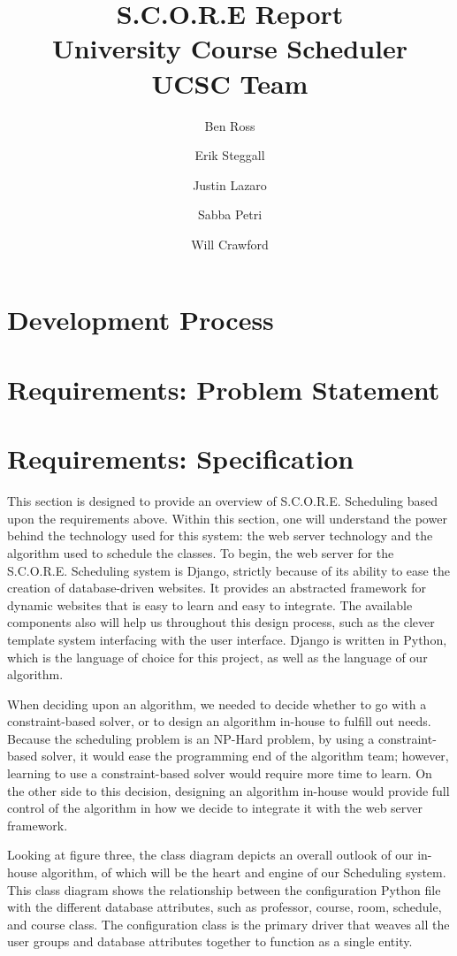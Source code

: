 \documentclass[12pt,article]{memoir}
\title{S.C.O.R.E Report \\ University Course Scheduler \\ UCSC Team}
\author{Ben Ross \\
	\and Erik Steggall \\
	\and Justin Lazaro \\
	\and Sabba Petri \\
	\and Will Crawford}
\date{}
\begin{document}
\maketitle

\chapter{Development Process} %
\chapter{Requirements: Problem Statement} %
\chapter{Requirements: Specification} %
This section is designed to provide an overview of S.C.O.R.E. Scheduling based upon the requirements above. Within this section, one will understand the power behind the technology used for this system: the web server technology and the algorithm used to schedule the classes. To begin, the web server for the S.C.O.R.E. Scheduling system is Django, strictly because of its ability to ease the creation of database-driven websites. It provides an abstracted framework for dynamic websites that is easy to learn and easy to integrate. The available components also will help us throughout this design process, such as the clever template system interfacing with the user interface. Django is written in Python, which is the language of choice for this project, as well as the language of our algorithm.

When deciding upon an algorithm, we needed to decide whether to go with a constraint-based solver, or to design an algorithm in-house to fulfill out needs. Because the scheduling problem is an NP-Hard problem, by using a constraint-based solver, it would ease the programming end of the algorithm team; however, learning to use a constraint-based solver would require more time to learn. On the other side to this decision, designing an algorithm in-house would provide full control of the algorithm in how we decide to integrate it with the web server framework.

Looking at figure three, the class diagram depicts an overall outlook of our in-house algorithm, of which will be the heart and engine of our Scheduling system. This class diagram shows the relationship between the configuration Python file with the different database attributes, such as professor, course, room, schedule, and course class. The configuration class is the primary driver that weaves all the user groups and database attributes together to function as a single entity.  
\end{document}
